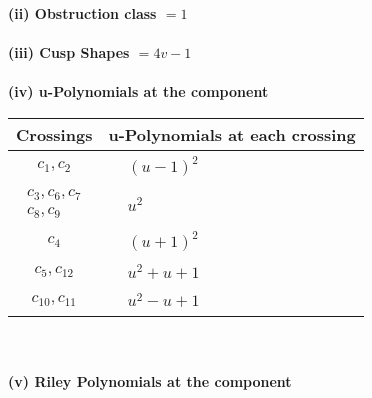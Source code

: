 \documentclass[1p]{elsarticle_modified}
\theoremstyle{definition}
\begin{document}
\flushleft \textbf{(ii) Obstruction class $= 1$}\\~\\
\flushleft \textbf{(iii) Cusp Shapes $= 4 v-1$}\\~\\
\newpage\renewcommand{\arraystretch}{1}
\flushleft \textbf{(iv) u-Polynomials at the component}\newline \\
\begin{tabular}{m{50pt}|m{274pt}}
Crossings & \hspace{64pt}u-Polynomials at each crossing \\
\hline $$\begin{aligned}c_{1},c_{2}\end{aligned}$$&$\begin{aligned}
&(u-1)^2
\end{aligned}$\\
\hline $$\begin{aligned}c_{3},c_{6},c_{7}\\c_{8},c_{9}\end{aligned}$$&$\begin{aligned}
&u^2
\end{aligned}$\\
\hline $$\begin{aligned}c_{4}\end{aligned}$$&$\begin{aligned}
&(u+1)^2
\end{aligned}$\\
\hline $$\begin{aligned}c_{5},c_{12}\end{aligned}$$&$\begin{aligned}
&u^2+u+1
\end{aligned}$\\
\hline $$\begin{aligned}c_{10},c_{11}\end{aligned}$$&$\begin{aligned}
&u^2- u+1
\end{aligned}$\\
\hline
\end{tabular}\\~\\
\newpage\renewcommand{\arraystretch}{1}
\flushleft \textbf{(v) Riley Polynomials at the component}\newline \\
\end{document}
